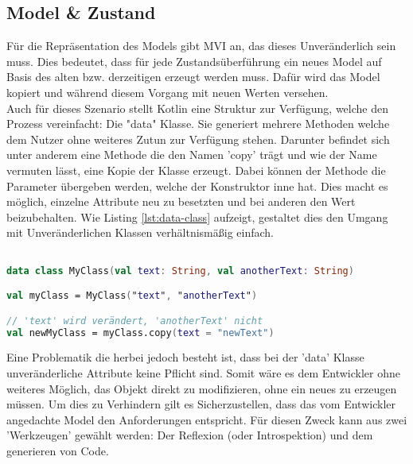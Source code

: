 \subsection{Model \& Zustand}
Für die Repräsentation des Models gibt MVI an, das dieses Unveränderlich sein muss. Dies bedeutet, dass für jede Zustandsüberführung ein neues Model auf Basis des alten bzw. derzeitigen erzeugt werden muss. Dafür wird das Model kopiert und während diesem Vorgang mit neuen Werten versehen. 
\\
Auch für dieses Szenario stellt Kotlin eine Struktur zur Verfügung, welche den Prozess vereinfacht: Die "data" Klasse. Sie generiert mehrere Methoden welche dem Nutzer ohne weiteres Zutun zur Verfügung stehen. Darunter befindet sich unter anderem eine Methode die den Namen 'copy' trägt und wie der Name vermuten lässt, eine Kopie der Klasse erzeugt. Dabei können der Methode die Parameter übergeben werden, welche der Konstruktor inne hat. Dies macht es möglich, einzelne Attribute neu zu besetzten und bei anderen den Wert beizubehalten. Wie Listing
\ref{lst:data-class}
aufzeigt, gestaltet dies den Umgang mit Unveränderlichen Klassen verhältnismäßig einfach.
\begin{lstlisting}[caption={data class}, label={lst:data-class}, language=Kotlin]

data class MyClass(val text: String, val anotherText: String)

val myClass = MyClass("text", "anotherText")

// 'text' wird verändert, 'anotherText' nicht
val newMyClass = myClass.copy(text = "newText")
\end{lstlisting}
\bigskip
Eine Problematik die herbei jedoch besteht ist, dass bei der 'data' Klasse unveränderliche Attribute keine Pflicht sind. Somit wäre es dem Entwickler ohne weiteres Möglich, das Objekt direkt zu modifizieren, ohne ein neues zu erzeugen müssen. Um dies zu Verhindern gilt es Sicherzustellen, dass das vom Entwickler angedachte Model den Anforderungen entspricht. Für diesen Zweck kann aus zwei 'Werkzeugen' gewählt werden: Der Reflexion (oder Introspektion) und dem generieren von Code.  
